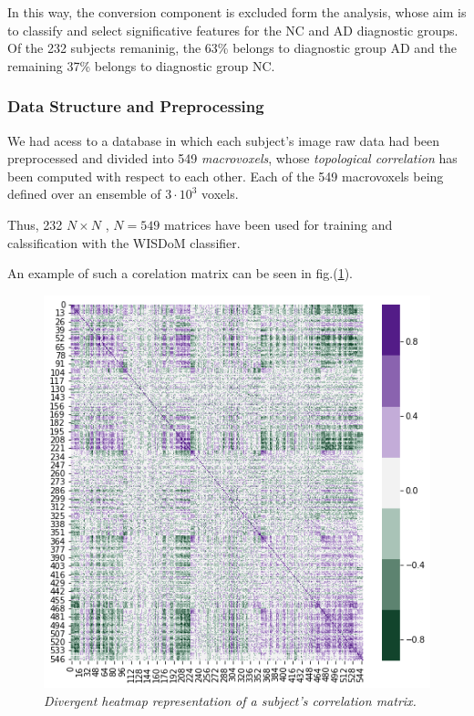 \documentclass[12pt,openright,twoside,a4paper]{book}
\begin{document}
In this way, the conversion component is excluded form the analysis, whose aim is to classify and select significative features for the NC and AD diagnostic groups.
Of the 232 subjects remaninig, the 63\% belongs to diagnostic group AD and the remaining 37\% belongs to diagnostic group NC.

\subsubsection*{Data Structure and Preprocessing}

We had acess to a database in which each subject's image raw data had been preprocessed and divided into 549 \textit{macrovoxels}, whose \textit{topological correlation} has been computed with respect to each other. Each of the 549 macrovoxels being defined over an ensemble of $3 \cdot 10^3$ voxels.

Thus, 232 $N\times N$ , $N=549$ matrices have been used for training and calssification with the WISDoM classifier.

An example of such a corelation matrix can be seen in fig.(\ref{sample-heat}).

\begin{figure}[!h]
\centering
\includegraphics[scale=0.5]{sample-heat}
\caption{\textit{Divergent heatmap representation of a subject's correlation matrix.}}
\label{sample-heat}
\end{figure}
\end{document}
